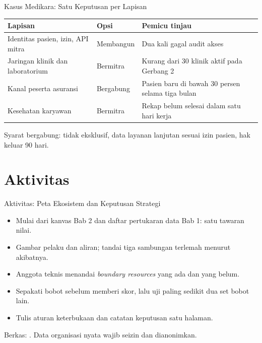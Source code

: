 \documentclass[aspectratio=169, table, 12pt]{beamer}
\begin{document}
\begin{frame}{{\Large Kasus Medikara: Satu Keputusan per Lapisan}}
  \footnotesize
  \begin{tabularx}{\textwidth}{>{\raggedright\arraybackslash}p{4.0cm}
      >{\raggedright\arraybackslash}p{2.0cm} >{\raggedright\arraybackslash}X}
    \hline
    \textbf{Lapisan} & \textbf{Opsi} & \textbf{Pemicu tinjau} \\ \hline
    Identitas pasien, izin, API mitra & Membangun & Dua kali gagal audit akses \\ \hline
    Jaringan klinik dan laboratorium & Bermitra & Kurang dari 30 klinik aktif pada Gerbang 2 \\ \hline
    Kanal peserta asuransi & Bergabung & Pasien baru di bawah 30 persen selama tiga bulan \\ \hline
    Kesehatan karyawan & Bermitra & Rekap belum selesai dalam satu hari kerja \\ \hline
  \end{tabularx}

  \vspace{8pt}
  \small Syarat bergabung: tidak eksklusif, data layanan lanjutan sesuai izin pasien, hak keluar 90 hari.
\end{frame}

\section{Aktivitas}

\begin{frame}{{\Large Aktivitas: Peta Ekosistem dan Keputusan Strategi}}
  \vspace{6pt}
  \begin{itemize}
    \item Mulai dari kanvas Bab 2 dan daftar pertukaran data Bab 1: satu tawaran nilai.
    \item Gambar pelaku dan aliran; tandai tiga sambungan terlemah menurut akibatnya.
    \item Anggota teknis menandai \textit{boundary resources} yang ada dan yang belum.
    \item Sepakati bobot sebelum memberi skor, lalu uji paling sedikit dua set bobot lain.
    \item Tulis aturan keterbukaan dan catatan keputusan satu halaman.
  \end{itemize}
  \vspace{4pt}
  {\footnotesize Berkas: . Data organisasi nyata wajib seizin dan dianonimkan.}
\end{frame}
\end{document}
